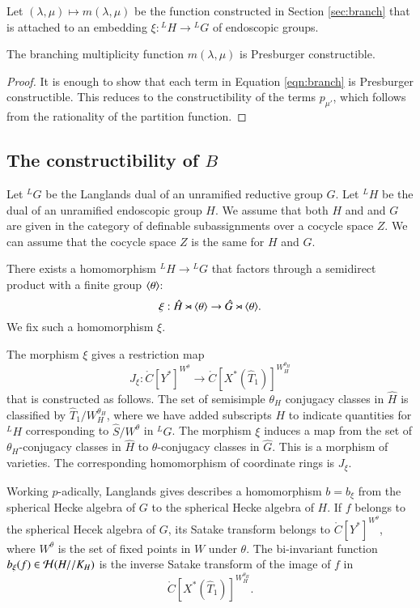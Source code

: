 \bigskip 

Let $(\lambda,\mu)\mapsto m(\lambda,\mu)$ be the function constructed
in Section \ref{sec:branch} that is attached to an embedding
$\xi:{}^LH\to {}^LG$ of endoscopic groups.

\begin{lemma}\label{lemma:branch} 
  The branching multiplicity function $m(\lambda,\mu)$ is Presburger
  constructible.
\end{lemma}

\begin{proof} 
  It is enough to show that each term in Equation \ref{eqn:branch} is
  Presburger constructible.  This reduces to the constructibility of
  the terms $p_{\mu'}$, which follows from the rationality of the
  partition function.
\end{proof}


\subsection{The constructibility of $B$}\label{sec:B}

Let ${}^LG$ be the Langlands dual of an unramified reductive group
$G$.  Let ${}^LH$ be the dual of an unramified endoscopic group $H$.
We assume that both $H$ and and $G$ are given in the category of
definable subassignments over a cocycle space $Z$.  We can assume that
the cocycle space $Z$ is the same for $H$ and $G$.

There exists a homomorphism ${}^LH\to {}^LG$ that factors through a
semidirect product with a finite group $\langle{\theta}\rangle$:
\[
\xi:\hat H \rtimes \langle{\theta}\rangle \to \hat G \rtimes \langle{\theta}\rangle.
\]
We fix such a homomorphism $\xi$.  

The morphism $\xi$ gives a restriction map
\begin{equation}
J_\xi:\ring{C}[Y^*]^{W^\theta} \to \ring{C}[X^*(\hat T_1)]^{W_H^{\theta_H}}
\end{equation}
that is constructed as follows.  The set of semisimple $\theta_H$
conjugacy classes in $\hat H$ is classified by $\hat
T_1/W_H^{\theta_H}$, where we have added subscripts $H$ to indicate
quantities for ${}^LH$ corresponding to $\hat S/W^\theta$ in ${}^LG$.
The morphism $\xi$ induces a map from the set of $\theta_H$-conjugacy
classes in $\hat H$ to $\theta$-conjugacy classes in $\hat G$.  This
is a morphism of varieties. The corresponding homomorphism of
coordinate rings is $J_\xi$.

Working $p$-adically, Langlands gives describes a homomorphism
$b = b_\xi$ from the spherical Hecke algebra of $G$ to the spherical
Hecke algebra of $H$.  If $f$ belongs to the spherical Hecek algebra
of $G$, its Satake transform belongs to $\ring{C}[Y^*]^{W^\theta}$,
where $W^\theta$ is the set of fixed points in $W$ under $\theta$.
The bi-invariant function $b_\xi(f)\in\mathcal H(H//K_H)$ is the inverse
Satake transform of the image of $f$ in
\[
\ring{C}[X^*(\hat T_1)]^{W_H^{\theta_H}}.
\]


